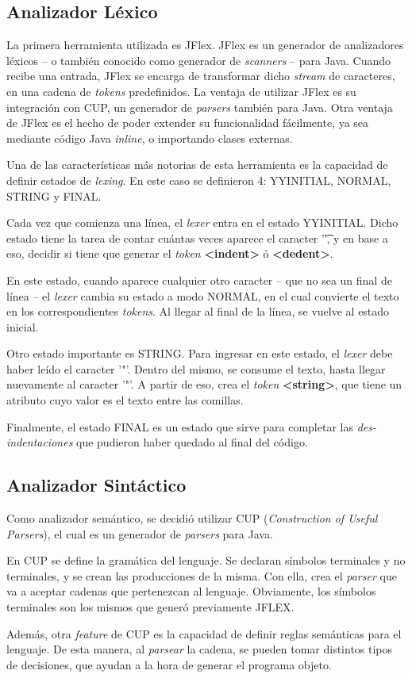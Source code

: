 \documentclass{article}
\begin{document}
\subsection{Analizador Léxico}
\par La primera herramienta utilizada es JFlex. JFlex es un generador de analizadores léxicos – o también conocido como generador de \textit{scanners} – para Java. Cuando recibe una entrada, JFlex se encarga de transformar dicho \textit{stream} de caracteres, en una cadena de \textit{tokens} predefinidos. La ventaja de utilizar JFlex es su integración con CUP, un generador de \textit{parsers} también para Java. Otra ventaja de JFlex es el hecho de poder extender su funcionalidad fácilmente, ya sea mediante código Java \textit{inline}, o importando clases externas.
\\
\par Una de las características más notorias de esta herramienta es la capacidad de definir estados de \textit{lexing}. En este caso se definieron 4: YYINITIAL, NORMAL, STRING y FINAL.
\par Cada vez que comienza una línea, el \textit{lexer} entra en el estado YYINITIAL. Dicho estado tiene la tarea de contar cuántas veces aparece el caracter '\t', y en base a eso, decidir si tiene que generar el \textit{token} \textbf{<indent>} ó \textbf{<dedent>}.
\par En este estado, cuando aparece cualquier otro caracter – que no sea un final de línea – el \textit{lexer} cambia su estado a modo NORMAL, en el cual convierte el texto en los correspondientes \textit{tokens}. Al llegar al final de la línea, se vuelve al estado inicial.
\par Otro estado importante es STRING. Para ingresar en este estado, el \textit{lexer} debe haber leído el caracter '"'. Dentro del mismo, se consume el texto, hasta llegar nuevamente al caracter '"'. A partir de eso, crea el \textit{token} \textbf{<string>}, que tiene un atributo cuyo valor es el texto entre las comillas.
\par Finalmente, el estado FINAL es un estado que sirve para completar las \textit{des-indentaciones} que pudieron haber quedado al final del código.

\subsection{Analizador Sintáctico}
\par Como analizador semántico, se decidió utilizar CUP  (\textit{Construction of Useful Parsers}), el cual es un generador de \textit{parsers} para Java. 
\par En CUP se define la gramática del lenguaje. Se declaran símbolos terminales y no terminales, y se crean las producciones de la misma. Con ella, crea el \textit{parser} que va a aceptar cadenas que pertenezcan al lenguaje. Obviamente, los símbolos terminales son los mismos que generó previamente JFLEX.
\par Además, otra \textit{feature} de CUP es la capacidad de definir reglas semánticas para el lenguaje. De esta manera, al \textit{parsear} la cadena, se pueden tomar distintos tipos de decisiones, que ayudan a la hora de generar el programa objeto.
\clearpage
\end{document}
